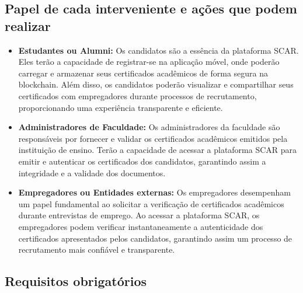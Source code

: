 \documentclass[10pt]{article}
\begin{document}
\subsection*{Papel de cada interveniente e ações que podem realizar}

\begin{itemize}

    \item \textbf{Estudantes ou Alumni:} Os candidatos são a essência da plataforma SCAR. Eles terão a capacidade de registrar-se na
          aplicação móvel, onde poderão carregar e armazenar seus certificados acadêmicos de forma segura na blockchain.
          Além disso, os candidatos poderão visualizar e compartilhar seus certificados com empregadores durante processos
          de recrutamento, proporcionando uma experiência transparente e eficiente.

    \item \textbf{Administradores de Faculdade:} Os administradores da faculdade são responsáveis por fornecer e validar
          os certificados acadêmicos emitidos pela instituição de ensino. Terão a capacidade de acessar a plataforma SCAR
          para emitir e autenticar os certificados dos candidatos, garantindo assim a integridade e a validade dos documentos.

    \item \textbf{Empregadores ou Entidades externas:} Os empregadores desempenham um papel fundamental ao solicitar a verificação de certificados
          acadêmicos durante entrevistas de emprego. Ao acessar a plataforma SCAR, os empregadores podem verificar
          instantaneamente a autenticidade dos certificados apresentados pelos candidatos, garantindo assim um processo
          de recrutamento mais confiável e transparente.

\end{itemize}

\subsection*{Requisitos obrigatórios}
\end{document}

